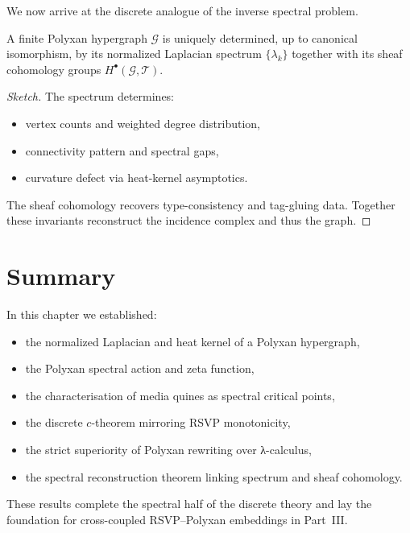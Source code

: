 We now arrive at the discrete analogue of the inverse spectral problem.

\begin{theorem}
\label{thm:spectral-reconstruction}
A finite Polyxan hypergraph $\mathcal{G}$ is uniquely determined, up to 
canonical isomorphism, by its normalized Laplacian spectrum
$\{\lambda_k\}$ together with its sheaf cohomology groups $H^\bullet(\mathcal{G},\mathscr{T})$.
\end{theorem}

\begin{proof}[Sketch]
The spectrum determines:
\begin{itemize}
  \item vertex counts and weighted degree distribution,
  \item connectivity pattern and spectral gaps,
  \item curvature defect via heat-kernel asymptotics.
\end{itemize}
The sheaf cohomology recovers type-consistency and tag-gluing data.
Together these invariants reconstruct the incidence complex and thus the graph.
\end{proof}

\section{Summary}

In this chapter we established:
\begin{itemize}
\item the normalized Laplacian and heat kernel of a Polyxan hypergraph,
\item the Polyxan spectral action and zeta function,
\item the characterisation of media quines as spectral critical points,
\item the discrete $c$-theorem mirroring RSVP monotonicity,
\item the strict superiority of Polyxan rewriting over λ-calculus,
\item the spectral reconstruction theorem linking spectrum and sheaf cohomology.
\end{itemize}

These results complete the spectral half of the discrete theory and lay the foundation
for cross-coupled RSVP--Polyxan embeddings in Part~III.

